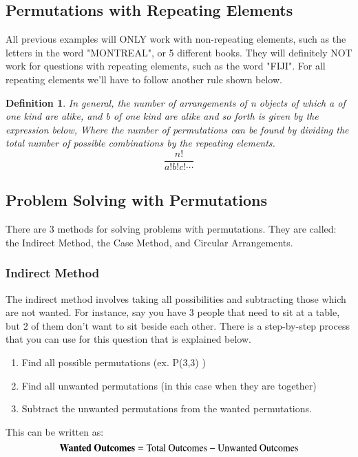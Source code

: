 \documentclass[final,1p,12pt]{elsarticle}
\newtheorem{definition}{Definition}
\begin{document}
    \subsection{Permutations with Repeating Elements}
    All previous examples will ONLY work with non-repeating elements, such as the letters in the word "MONTREAL", or 5 different books. They will definitely NOT work for questions with repeating elements, such as the word "FIJI". For all repeating elements we'll have to follow another rule shown below.
    \begin{definition}
        In general, the number of arrangements of \emph{n} objects of which \emph{a} of one kind are alike, and \emph{b} of one kind are alike and so forth is given by the expression below, Where the number of permutations can be found by dividing the total number of possible combinations by the repeating elements.
        \begin{equation}
            \frac{n!}{a!b!c!\cdots}
        \end{equation}
    \end{definition}
    
    \subsection{Problem Solving with Permutations}
    There are 3 methods for solving problems with permutations. They are called: the Indirect Method, the Case Method, and Circular Arrangements.
    
        \subsubsection{Indirect Method}
        The indirect method involves taking all possibilities and subtracting those which are not wanted. For instance, say you have 3 people that need to sit at a table, but 2 of them don't want to sit beside each other. There is a step-by-step process that you can use for this question that is explained below.
        \begin{enumerate}
                \item Find all possible permutations (ex. P(3,3) )
                \item Find all unwanted permutations (in this case when they are together)
                \item Subtract the unwanted permutations from the wanted permutations.
            \end{enumerate}
        This can be written as:
        \begin{equation}
            \mbox{\textbf{Wanted Outcomes}} = \mbox{Total Outcomes}-\mbox{Unwanted Outcomes}
        \end{equation}
    
\end{document}
